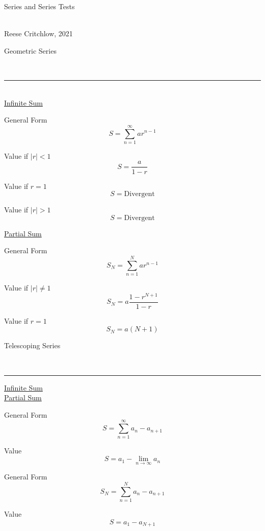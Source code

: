 \documentclass{article}
\begin{document}
\begin{center}
    \begin{Large}
        Series and Series Tests
    \end{Large}\\
    Reese Critchlow, 2021
\end{center}

\begin{large}
    Geometric Series
\end{large}\\
\noindent\rule{\textwidth}{0.5pt}\smallskip\\
\indent \underline{Infinite Sum}
\begin{multicols}{4}
\begin{center}
    General Form
    \[
        S = \sum_{n=1}^{\infty}ar^{n-1}
    \]
    
    Value if $|r| < 1$
    \[
        S = \frac{a}{1-r}
    \]
    
    Value if $r = 1$
    \[
        S = \textrm{Divergent}
    \]
    
    Value if $|r| > 1$
    \[
        S = \textrm{Divergent}
    \]
\end{center}
\end{multicols}

\indent \underline{Partial Sum}
\begin{multicols}{3}
\begin{center}
    General Form
    \[
        S_N = \sum_{n=1}^{N}ar^{n-1}
    \]
    
    Value if $|r| \neq 1$
    \[
        S_N = a\frac{1-r^{N+1}}{1-r}
    \]
    
    Value if $r = 1$
    \[
        S_N = a(N+1)
    \]
    
\end{center}
\end{multicols}


\begin{large}
    Telescoping Series
\end{large}\\
\noindent\rule{\textwidth}{0.5pt}
\begin{multicols}{2}
    \underline{Infinite Sum}\\\columnbreak
    \underline{Partial Sum}
\end{multicols}

\begin{multicols}{4}
\begin{center}
    General Form 
    \[
        S = \sum_{n = 1}^{\infty}{a_n - a_{n+1}}
    \]
    
    Value
    \[
        S = a_1 - \lim_{n \to \infty}{a_n}
    \]
    
    General Form 
    \[
        S_N = \sum_{n = 1}^{N}{a_n - a_{n+1}}
    \]
    
    Value
    \[
        S = a_1 - {a_{N+1}}
    \]
    

    
\end{center}
\end{multicols}
\end{document}
